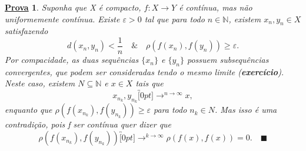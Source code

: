 \documentclass{article}
\newtheorem*{proof*}{\underline{Prova}}
\renewcommand\qedsymbol{$\blacksquare$}
\begin{document}
\begin{proof*}
  Suponha que X é compacto, \(f:X\rightarrow Y\) é contínua, mas não uniformemente contínua. Existe \(\varepsilon >0\) tal que
para todo \(n\in \mathbb{N}\), existem \(x_{n}, y_{n}\in X\) satisfazendo 
  \[
    d(x_{n},y_{n}) < \frac{1}{n}\quad\&\quad \rho (f(x_{n}), f(y_{n}))\geq \varepsilon .
  \]
  Por compacidade, as duas sequências \(\{x_{n}\}\) e \(\{y_{n}\}\) possuem subsequências convergentes, que podem
ser consideradas tendo o mesmo limite (\textbf{exercício}). Neste caso, existem \(N\subseteq \mathbb{N}\) e \(x\in X\) tais que 
  \[
    x_{n_{k}}, y_{n_{k}}\overbracket[0pt]{\longrightarrow}^{n\to \infty}x,
  \]
  enquanto que \(\rho (f(x_{n_{k}}), f(y_{n_{k}}))\geq \varepsilon \) para todo \(n_{k}\in N\).
  Mas isso é uma contradição, pois f ser contínua quer dizer que 
    \[
      \rho (f(x_{n_{k}}), f(y_{n_{k}}))\overbracket[0pt]{\longrightarrow}^{k\to \infty}\rho(f(x), f(x)) = 0.\quad \text{\qedsymbol}
    \]
\end{proof*}
\end{document}
